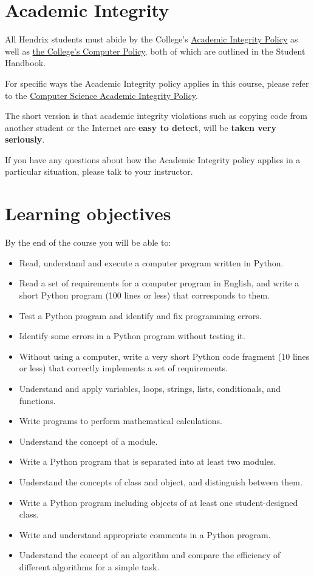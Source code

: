 \documentclass{article}
\begin{document}
\section*{Academic Integrity}

All Hendrix students must abide by the College's
\href{https://www.hendrix.edu/studentlife/handbook.aspx?id=67121}{Academic
Integrity Policy} as well as
\href{https://www.hendrix.edu/studentlife/handbook.aspx?id=42308}{the
College's Computer Policy}, both of which are outlined in the Student
Handbook.

For specific ways the Academic Integrity policy applies in this
course, please refer to the
\href{http://ozark.hendrix.edu/~yorgey/ac-integrity-policy.html}{Computer
  Science Academic Integrity Policy}.

The short version is that academic integrity violations such as
copying code from another student or the Internet are \textbf{easy to
  detect}, will be \textbf{taken
very seriously}.

If you have any questions about how the Academic Integrity policy
applies in a particular situation, please talk to your instructor.

\section*{Learning objectives}

By the end of the course you will be able to:

\begin{itemize}
\item Read, understand and execute a computer program written in Python.
\item Read a set of requirements for a computer program in English, and
    write a short Python program (100 lines or less) that corresponds to
    them.
\item Test a Python program and identify and fix programming errors.
\item Identify some errors in a Python program without testing it.
\item Without using a computer, write a very short Python code fragment
    (10 lines or less) that correctly implements a set of requirements.
\item Understand and apply variables, loops, strings, lists, conditionals,
    and functions.
\item Write programs to perform mathematical calculations.
\item Understand the concept of a module.
\item Write a Python program that is separated into at least two modules.
\item Understand the concepts of class and object, and distinguish between
    them.
\item Write a Python program including objects of at least one
    student-designed class.
\item Write and understand appropriate comments in a Python program.
\item Understand the concept of an algorithm and compare the efficiency of
    different algorithms for a simple task.
\end{itemize}
\end{document}
